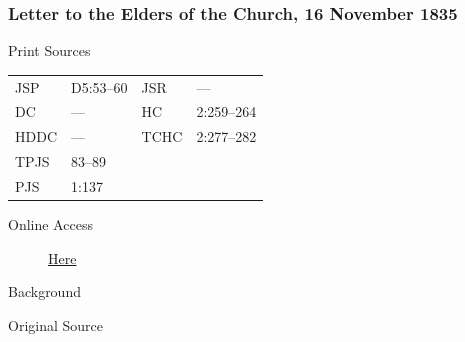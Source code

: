 		\subsubsection{Letter to the Elders of the Church, 16 November 1835}
			\label{EMS-1835-JS-16-NOV-1835}
			
			\begin{description}
				\item[Print Sources]
			\end{description}

				\begin{tabular}{p{0.5in}p{1in}p{0.5in}p{1in}}
				JSP	 	& D5:53--60		& JSR 		& --- \\
				DC	 	& --- 			& HC 		& 2:259--264 \\
				HDDC 	& ---			& TCHC 		& 2:277--282 \\
				TPJS 	& 83--89			& 	 		&  \\
				PJS 	& 1:137			& 	 		&  \\
				\end{tabular}
			
			\begin{description}
				\item[Online Access] \href{https://www.josephsmithpapers.org/paper-summary/letter-to-the-elders-of-the-church-16-november-1835/1}{Here}
			\end{description}
			
			\begin{description}
				\item[Background]
			\end{description}
			
			
			\begin{description}
				\item[Original Source]
			\end{description}
			
			
